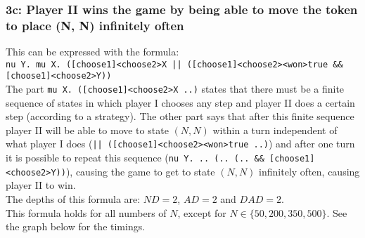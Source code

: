 \documentclass[10pt,a4paper]{article}
\begin{document}

\subsubsection{3c: Player II wins the game by being able to move the token to place (N, N) infinitely often}\label{board3}
This can be expressed with the formula:\\
{\tt nu Y. mu X. ([choose1]<choose2>X || ([choose1]<choose2><won>true \&\& [choose1]<choose2>Y))}\\
The part {\tt mu X. ([choose1]<choose2>X ..)} states that there must be a finite sequence of states in which player I chooses any step and player II does a certain step (according to a strategy). The other part says that after this finite sequence player II will be able to move to state $(N, N)$ within a turn independent of what player I does ({\tt || ([choose1]<choose2><won>true ..)}) and after one turn it is possible to repeat this sequence ({\tt nu Y. .. (.. (.. \&\& [choose1]<choose2>Y))}), causing the game to get to state $(N, N)$ infinitely often, causing player II to win.\\
The depths of this formula are: $ND = 2$, $AD = 2$ and $DAD = 2$.\\
This formula holds for all numbers of $N$, except for $N \in \{50, 200, 350, 500\}$. See the graph below for the timings.\\

\end{document}
